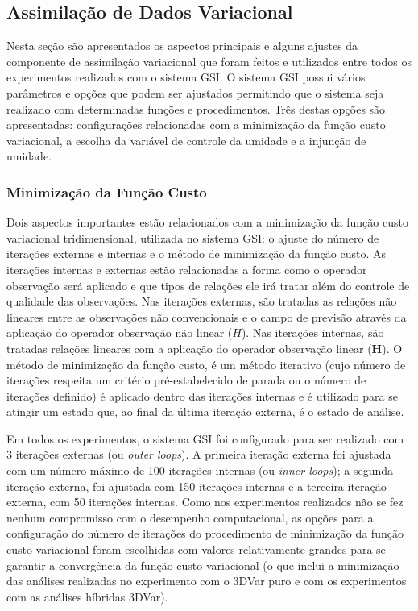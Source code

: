 \subsection{Assimilação de Dados Variacional}

Nesta seção são apresentados os aspectos principais e alguns ajustes da componente de assimilação variacional que foram feitos e utilizados entre todos os experimentos realizados com o sistema GSI. O sistema GSI possui vários parâmetros e opções que podem ser ajustados permitindo que o sistema seja realizado com determinadas funções e procedimentos. Três destas opções são apresentadas: configurações relacionadas com a minimização da função custo variacional, a escolha da variável de controle da umidade e a injunção de umidade.

\subsubsection*{Minimização da Função Custo}

Dois aspectos importantes estão relacionados com a minimização da função custo variacional tridimensional, utilizada no sistema GSI: o ajuste do número de iterações externas e internas e o método de minimização da função custo. As iterações internas e externas estão relacionadas a forma como o operador observação será aplicado e que tipos de relações ele irá tratar \cite{nichols/2010} além do controle de qualidade das observações. Nas iterações externas, são tratadas as relações não lineares entre as observações não convencionais e o campo de previsão através da aplicação do operador observação não linear ($H$). Nas iterações internas, são tratadas relações lineares com a aplicação do operador observação linear ($\mathbf{H}$). O método de minimização da função custo, é um método iterativo (cujo número de iterações respeita um critério pré-estabelecido de parada ou o número de iterações definido) é aplicado dentro das iterações internas e é utilizado para se atingir um estado que, ao final da última iteração externa, é o estado de análise.

Em todos os experimentos, o sistema GSI foi configurado para ser realizado com 3 iterações externas (ou \textit{outer loops}). A primeira iteração externa foi ajustada com um número máximo de 100 iterações internas (ou \textit{inner loops}); a segunda iteração externa, foi ajustada com 150 iterações internas e a terceira iteração externa, com 50 iterações internas. Como nos experimentos realizados não se fez nenhum compromisso com o desempenho computacional, as opções para a configuração do número de iterações do procedimento de minimização da função custo variacional foram escolhidas com valores relativamente grandes para se garantir a convergência da função custo variacional (o que inclui a minimização das análises realizadas no experimento com o 3DVar puro e com os experimentos com as análises híbridas 3DVar). 

